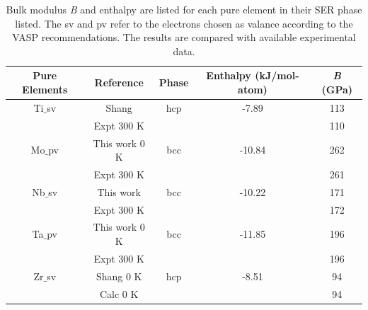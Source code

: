 \newpage
\begin{table}[H]
	\caption{Bulk modulus \textit{B} and enthalpy are listed for each pure element in their SER phase listed. The sv and pv refer to the electrons chosen as valance according to the VASP recommendations. The results are compared with available experimental data.}
	\centering
	\begin{tabular}{ c c c c c }
		\hline
		Pure Elements & Reference & Phase & Enthalpy (kJ/mol-atom) & \textit{B} (GPa) \\
		\hline
		Ti$\_$sv & Shang \cite{Shang2010b} & hcp & -7.89 & 113\\
                 & Expt 300 K \cite{WolframResearch} & & & 110\\
        Mo$\_$pv & This work 0 K & bcc & -10.84 & 262\\
                        & Expt 300 K \cite{Dickinson1967a} & & & 261\\
        Nb$\_$sv & This work & bcc & -10.22 & 171\\
                       & Expt 300 K \cite{Bolef1961} & & & 172\\
         Ta$\_$pv & This work 0 K & bcc & -11.85 & 196\\
                       & Expt 300 K \cite{Bolef1961} & & & 196\\
          Zr$\_$sv & Shang 0 K \cite{Shang2010b} & hcp & -8.51 & 94\\
                        & Calc 0 K \cite{Treco1953_964,Bergerhoff1983,Karlsruhe,MaterialsProject} & & & 94\\
		\hline
	\end{tabular}
	\label{Ch3-table:pspureele}
\end{table}
\clearpage

